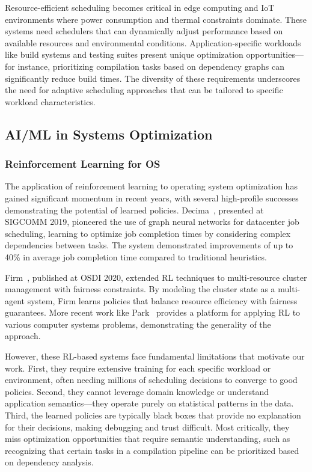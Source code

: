 Resource-efficient scheduling becomes critical in edge computing and IoT environments where power consumption and thermal constraints dominate. These systems need schedulers that can dynamically adjust performance based on available resources and environmental conditions. Application-specific workloads like build systems and testing suites present unique optimization opportunities—for instance, prioritizing compilation tasks based on dependency graphs can significantly reduce build times. The diversity of these requirements underscores the need for adaptive scheduling approaches that can be tailored to specific workload characteristics.

\subsection{AI/ML in Systems Optimization}

\subsubsection{Reinforcement Learning for OS}

The application of reinforcement learning to operating system optimization has gained significant momentum in recent years, with several high-profile successes demonstrating the potential of learned policies. Decima~\cite{mao2019decima}, presented at SIGCOMM 2019, pioneered the use of graph neural networks for datacenter job scheduling, learning to optimize job completion times by considering complex dependencies between tasks. The system demonstrated improvements of up to 40\% in average job completion time compared to traditional heuristics.

Firm~\cite{qiu2020firm}, published at OSDI 2020, extended RL techniques to multi-resource cluster management with fairness constraints. By modeling the cluster state as a multi-agent system, Firm learns policies that balance resource efficiency with fairness guarantees. More recent work like Park~\cite{mao2019park} provides a platform for applying RL to various computer systems problems, demonstrating the generality of the approach.

However, these RL-based systems face fundamental limitations that motivate our work. First, they require extensive training for each specific workload or environment, often needing millions of scheduling decisions to converge to good policies. Second, they cannot leverage domain knowledge or understand application semantics—they operate purely on statistical patterns in the data. Third, the learned policies are typically black boxes that provide no explanation for their decisions, making debugging and trust difficult. Most critically, they miss optimization opportunities that require semantic understanding, such as recognizing that certain tasks in a compilation pipeline can be prioritized based on dependency analysis.

